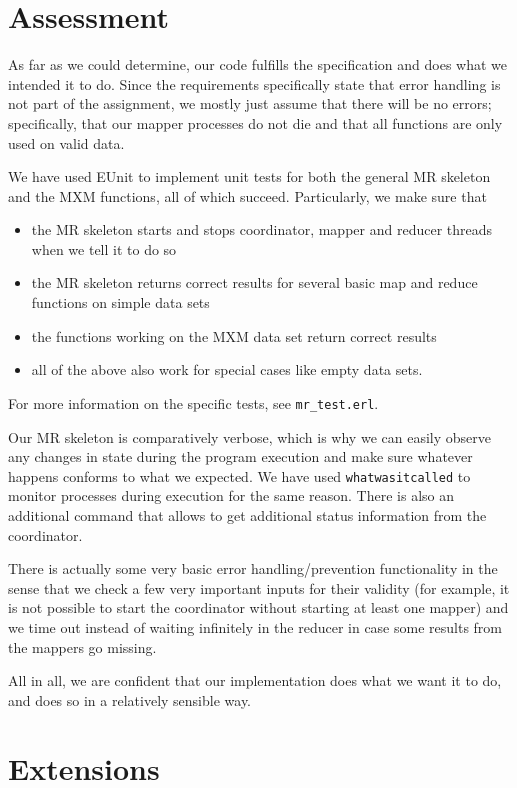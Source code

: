 \documentclass[a4paper]{article}
\begin{document}
\section*{Assessment}
As far as we could determine, our code fulfills the specification and does what we intended it to do. Since the requirements specifically state that error handling is not part of the assignment, we mostly just assume that there will be no errors; specifically, that our mapper processes do not die and that all functions are only used on valid data.

We have used EUnit to implement unit tests for both the general MR skeleton and the MXM functions, all of which succeed. Particularly, we make sure that
\begin{itemize}
  \item the MR skeleton starts and stops coordinator, mapper and reducer threads when we tell it to do so
  \item the MR skeleton returns correct results for several basic map and reduce functions on simple data sets
  \item the functions working on the MXM data set return correct results
  \item all of the above also work for special cases like empty data sets.
\end{itemize}
For more information on the specific tests, see \texttt{mr\_test.erl}.

Our MR skeleton is comparatively verbose, which is why we can easily observe any changes in state during the program execution and make sure whatever happens conforms to what we expected. We have used \texttt{whatwasitcalled} to monitor processes during execution for the same reason. There is also an additional command that allows to get additional status information from the coordinator.

There is actually some very basic error handling/prevention functionality in the sense that we check a few very important inputs for their validity (for example, it is not possible to start the coordinator without starting at least one mapper) and we time out instead of waiting infinitely in the reducer in case some results from the mappers go missing.

All in all, we are confident that our implementation does what we want it to do, and does so in a relatively sensible way.

\section*{Extensions}
\end{document}
